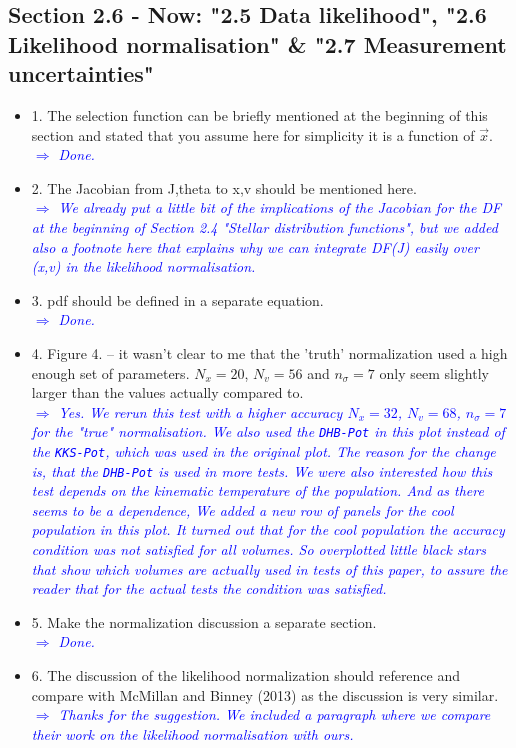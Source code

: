 \documentclass[10pt,a4paper]{article}
\newcommand{\Comment}[1]{\textsl{\textcolor{Blue}{$\Longrightarrow$ {#1}}}}
\begin{document}
\subsection{Section 2.6 - Now: "2.5 Data likelihood", "2.6 Likelihood normalisation" \& "2.7 Measurement uncertainties"}
\begin{itemize}
\item 1. The selection function can be briefly mentioned at the beginning of this section and stated that you assume here for simplicity it is a function of $\vec{x}$. \\\Comment{Done.}
\item 2. The Jacobian from J,theta to x,v should be mentioned here. \\\Comment{We already put a little bit of the implications of the Jacobian for the DF at the beginning of Section 2.4 "Stellar distribution functions", but we added also a footnote here that explains why we can integrate DF(J) easily over (x,v) in the likelihood normalisation.}
\item 3. pdf should be defined in a separate equation. \\\Comment{Done.}
\item 4. Figure 4. -- it wasn't clear to me that the 'truth' normalization used a high enough set of parameters. $N_x=20$, $N_v=56$ and $n_\sigma=7$ only seem slightly larger than the values actually compared to. \\\Comment{Yes. We rerun this test with a higher accuracy $N_x=32$, $N_v = 68$, $n_\sigma = 7$ for the "true" normalisation.  We also used the \texttt{DHB-Pot} in this plot instead of the \texttt{KKS-Pot}, which was used in the original plot. The reason for the change is, that the \texttt{DHB-Pot} is used in more tests. We were also interested how this test depends on the kinematic temperature of the population. And as there seems to be a dependence, We added a new row of panels for the cool population in this plot. It turned out that for the cool population the accuracy condition was not satisfied for all volumes. So overplotted little black stars that show which volumes are actually used in tests of this paper, to assure the reader that for the actual tests the condition was satisfied.}
\item 5. Make the normalization discussion a separate section. \\\Comment{Done.}
\item 6. The discussion of the likelihood normalization should reference and compare with McMillan and Binney (2013) as the discussion is very similar. \\\Comment{Thanks for the suggestion. We included a paragraph where we compare their work on the likelihood normalisation with ours.}

\end{itemize}
\end{document}
